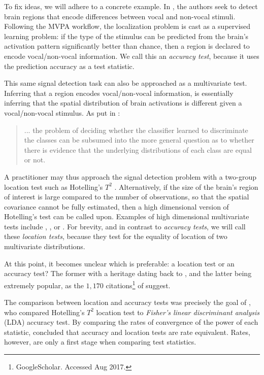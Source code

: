 \documentclass[12pt,a4paper]{article}
\begin{document}
To fix ideas, we will adhere to a concrete example.
In \cite{gilron_quantifying_2016}, the authors seek to detect brain regions that encode differences between vocal and non-vocal stimuli. 
Following the MVPA workflow, the localization problem is cast as a supervised learning problem: if the type of the stimulus can be predicted from the brain's activation pattern significantly better than chance, then a region is declared to encode vocal/non-vocal information. 
We call this an \emph{accuracy test}, because it uses the prediction accuracy as a test statistic. 

This same signal detection task can also be approached as a multivariate test.
Inferring that a region encodes vocal/non-vocal information, is essentially inferring that the spatial distribution of brain activations is different given a vocal/non-vocal stimulus. 
As put in \cite{pereira_machine_2009}: 
\begin{quote}
... the problem of deciding whether the classifier learned to discriminate the classes can be subsumed into the more general question as to whether there is evidence that the underlying distributions of each class are equal or not.
\end{quote}
A practitioner may thus approach the signal detection problem with a two-group location test such as Hotelling's $T^2$ \citep{anderson_introduction_2003}.
Alternatively, if the size of the brain's region of interest is large compared to the number of observations, so that the spatial covariance cannot be fully estimated, then a high dimensional version of Hotelling's test can be called upon.
Examples of high dimensional multivariate tests include \cite{schafer_shrinkage_2005}, \cite{goeman2006testing}, or \cite{srivastava_multivariate_2007} .
For brevity, and in contrast to \emph{accuracy tests}, we will call these \emph{location tests}, because they test for the equality of location of two multivariate distributions. 


At this point, it becomes unclear which is preferable: a location test or an accuracy test?
The former with a heritage dating back to \cite{hotelling_generalization_1931}, and the latter being extremely popular, as the $1,170$ citations\footnote{GoogleScholar. Accessed Aug 2017.} of \cite{kriegeskorte_information-based_2006} suggest. 

The comparison between location and accuracy tests was precisely the goal of \cite{ramdas_classification_2016}, who compared Hotelling's $T^2$ location test to \emph{Fisher's linear discriminant analysis} (LDA) accuracy test. 
By comparing the rates of convergence of the power of each statistic, \cite{ramdas_classification_2016} concluded that accuracy and location tests are rate equivalent. 
Rates, however, are only a first stage when comparing test statistics. 
\end{document}
